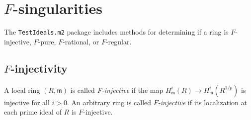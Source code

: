 \documentclass{amsart}
\renewcommand{\leq}{\leqslant}
\begin{document}





\section{$F$-singularities}\label{Section: F-singularities}

The \texttt{TestIdeals.m2} package includes methods for determining if a ring is $F$-injective, $F$-pure, $F$-rational, or $F$-regular.

\subsection{$F$-injectivity}

\begin{definition}
A local ring $(R, \mathfrak{m})$ is called \emph{F-injective} if the map
$H^{i}_{\mathfrak{m}}(R) \rightarrow H^{i}_{\mathfrak{m}}(R^{1/p})$ is
injective for all $i >0$. An arbitrary ring is called \emph{$F$-injective} if its
localization at each prime ideal of $R$ is $F$-injective.
\end{definition}
\end{document}
